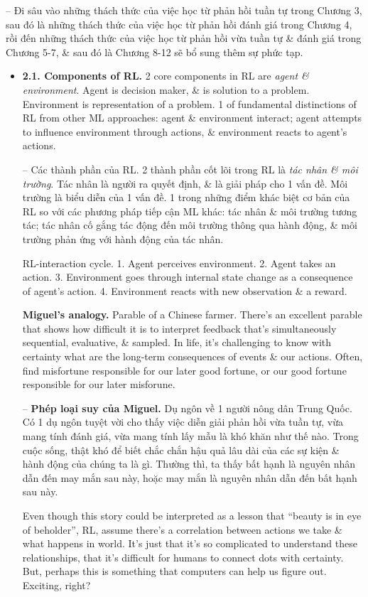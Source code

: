 \documentclass{article}
\begin{document}
\begin{itemize}
    -- Đi sâu vào những thách thức của việc học từ phản hồi tuần tự trong Chương 3, sau đó là những thách thức của việc học từ phản hồi đánh giá trong Chương 4, rồi đến những thách thức của việc học từ phản hồi vừa tuần tự \& đánh giá trong Chương 5-7, \& sau đó là Chương 8-12 sẽ bổ sung thêm sự phức tạp.
    \begin{itemize}
        \item {\bf2.1. Components of RL.} 2 core components in RL are {\it agent \& environment}. Agent is decision maker, \& is solution to a problem. Environment is representation of a problem. 1 of fundamental distinctions of RL from other ML approaches: agent \& environment interact; agent attempts to influence environment through actions, \& environment reacts to agent's actions.

        -- {\sf Các thành phần của RL.} 2 thành phần cốt lõi trong RL là {\it tác nhân \& môi trường}. Tác nhân là người ra quyết định, \& là giải pháp cho 1 vấn đề. Môi trường là biểu diễn của 1 vấn đề. 1 trong những điểm khác biệt cơ bản của RL so với các phương pháp tiếp cận ML khác: tác nhân \& môi trường tương tác; tác nhân cố gắng tác động đến môi trường thông qua hành động, \& môi trường phản ứng với hành động của tác nhân.

        {\sf RL-interaction cycle.} 1. Agent perceives environment. 2. Agent takes an action. 3. Environment goes through internal state change as a consequence of agent's action. 4. Environment reacts with new observation \& a reward.

        {\bf Miguel's analogy.} Parable of a Chinese farmer. There's an excellent parable that shows how difficult it is to interpret feedback that's simultaneously sequential, evaluative, \& sampled. In life, it’s challenging to know with certainty what are the long-term consequences of events \& our actions. Often, find misfortune responsible for our later good fortune, or our good fortune responsible for our later misforune.

        -- {\bf Phép loại suy của Miguel.} Dụ ngôn về 1 người nông dân Trung Quốc. Có 1 dụ ngôn tuyệt vời cho thấy việc diễn giải phản hồi vừa tuần tự, vừa mang tính đánh giá, vừa mang tính lấy mẫu là khó khăn như thế nào. Trong cuộc sống, thật khó để biết chắc chắn hậu quả lâu dài của các sự kiện \& hành động của chúng ta là gì. Thường thì, ta thấy bất hạnh là nguyên nhân dẫn đến may mắn sau này, hoặc may mắn là nguyên nhân dẫn đến bất hạnh sau này.

        Even though this story could be interpreted as a lesson that ``beauty is in eye of beholder'', RL, assume there's a correlation between actions we take \& what happens in world. It's just that it's so complicated to understand these relationships, that it's difficult for humans to connect dots with certainty. But, perhaps this is something that computers can help us figure out. Exciting, right?


\end{itemize}
\end{itemize}
\end{document}
